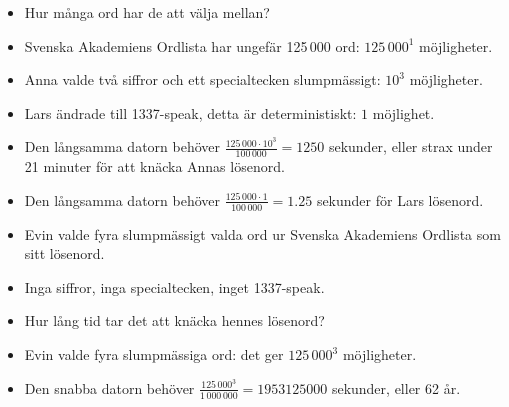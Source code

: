 \begin{frame}
  \begin{solution}
    \begin{itemize}
      \item<+-> Hur många ord har de att välja mellan?
      \item<+-> Svenska Akademiens Ordlista har ungefär 125\,000 ord: 
        \(125\,000^1\) möjligheter.
      \item<+-> Anna valde två siffror och ett specialtecken slumpmässigt: 
        \(10^3\) möjligheter.
      \item<+-> Lars ändrade till 1337-speak, detta är deterministiskt: \(1\) 
        möjlighet.
      \item<+-> Den \alert{långsamma} datorn behöver \(\frac{125\,000\cdot 
        10^3}{100\,000} = 1250\) sekunder, eller strax under 21 minuter för att 
        knäcka Annas lösenord.
      \item<+-> Den \alert{långsamma} datorn behöver \(\frac{125\,000\cdot 
        1}{100\,000} = 
        1.25\) sekunder för Lars lösenord.
    \end{itemize}
  \end{solution}
\end{frame}

\begin{frame}
  \begin{exercise}
    \begin{itemize}
      \item Evin valde fyra slumpmässigt valda ord ur Svenska Akademiens 
        Ordlista som sitt lösenord.
      \item Inga siffror, inga specialtecken, inget 1337-speak.
      \item Hur lång tid tar det att knäcka hennes lösenord?
    \end{itemize}
  \end{exercise}
\end{frame}

\begin{frame}
  \begin{solution}
    \begin{itemize}
      \item Evin valde fyra slumpmässiga ord: det ger \(125\,000^3\) 
        möjligheter.
      \item Den \alert{snabba} datorn behöver \(\frac{125\,000^3}{1\,000\,000} 
        = 1953125000\) sekunder, eller 62 år.
    \end{itemize}
  \end{solution}
\end{frame}

